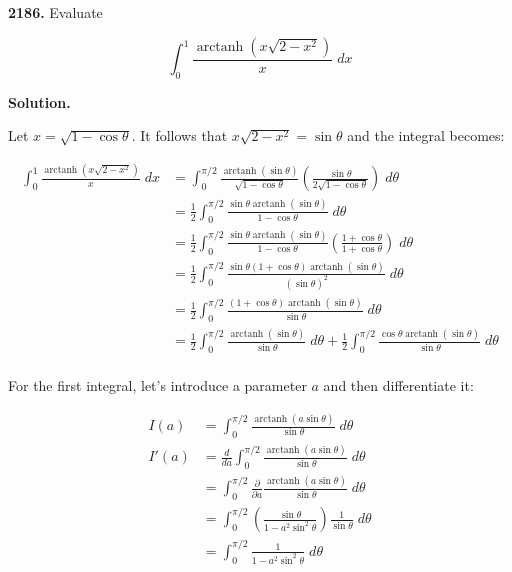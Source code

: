 \documentclass{letter}
\DeclareMathOperator\arctanh{arctanh}
\begin{document}
\newtheorem{lemma}{Lemma}
\newcommand\term[1]{\frac{x^{#1}}{#1!}}

\begin{letter}{}
  \textbf{2186.} Evaluate

  $$\int_0^1\frac{\arctanh\left(x \sqrt{2-x^2}\right)}{x}\;dx $$

 
  \textbf{Solution.}

  Let $x=\sqrt{1-\cos\theta}$. It follows that $x\sqrt{2-x^2}=\sin\theta$ and the integral becomes:

  \begin{align*}
  \int_0^1\frac{\arctanh\left(x \sqrt{2-x^2}\right)}{x}\;dx 
    &=
    \int_0^{\pi/2}\frac
      {\arctanh\left(\sin\theta
      \right)}
    {\sqrt{1-\cos\theta}}\left(\frac{\sin\theta}{2\sqrt{1-\cos\theta}}\right)\;d\theta\\
    &=
    \frac{1}{2}\int_0^{\pi/2}\frac
      {\sin\theta\arctanh\left(\sin\theta\right)}
    {1-\cos\theta}\;d\theta\\
    &=
    \frac{1}{2}\int_0^{\pi/2}\frac
      {\sin\theta\arctanh\left(\sin\theta\right)}
    {1-\cos\theta}\left(\frac
    {1+\cos\theta}{1+\cos\theta}\right)\;d\theta\\
    &=
    \frac{1}{2}\int_0^{\pi/2}\frac
      {\sin\theta(1+\cos\theta)\arctanh\left(\sin\theta\right)}
    {(\sin\theta)^2}\;d\theta\\
    &=
    \frac{1}{2}\int_0^{\pi/2}\frac
      {(1+\cos\theta)\arctanh\left(\sin\theta\right)}
    {\sin\theta}\;d\theta\\
    &=
    \frac{1}{2}\int_0^{\pi/2}\frac
      {\arctanh\left(\sin\theta\right)}
    {\sin\theta}\;d\theta
    +\frac{1}{2}\int_0^{\pi/2}\frac
      {\cos\theta\arctanh\left(\sin\theta\right)}
    {\sin\theta}\;d\theta
    \\
  \end{align*}

  For the first integral, let's introduce a parameter $a$ and then differentiate it:

  \begin{align*}
    I(a) &=
    \int_0^{\pi/2}\frac
      {\arctanh\left(a \sin\theta\right)}
    {\sin\theta}\;d\theta\\
    I'(a) &= \frac{d}{da}
      \int_0^{\pi/2}\frac
        {\arctanh\left(a \sin\theta\right)}
      {\sin\theta}\;d\theta\\
      &=
      \int_0^{\pi/2}\frac{\partial}{\partial a}\frac
        {\arctanh\left(a \sin\theta\right)}
      {\sin\theta}\;d\theta\\
      &=
      \int_0^{\pi/2}\left(\frac{\sin\theta}{1-a^2\sin^2\theta}\right)
      \frac{1}{\sin\theta}\;d\theta\\
      &=
      \int_0^{\pi/2}\frac{1}{1-a^2\sin^2\theta}\;d\theta
  \end{align*}


\end{letter}
\end{document}

